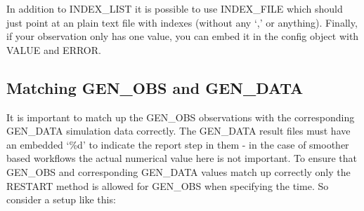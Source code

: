 \documentclass[letterpaper,10pt,english]{sphinxmanual}
\begin{document}
In addition to INDEX\_LIST it is possible to use INDEX\_FILE which
should just point at an plain text file with indexes (without any ‘,’
or anything). Finally, if your observation only has one value, you can
embed it in the config object with VALUE and ERROR.


\subsection{Matching GEN\_OBS and GEN\_DATA}
\label{\detokenize{observations/index:matching-gen-obs-and-gen-data}}
It is important to match up the GEN\_OBS observations with the
corresponding GEN\_DATA simulation data correctly. The GEN\_DATA result
files must have an embedded ‘\%d’ to indicate the report step in them -
in the case of smoother based workflows the actual numerical value
here is not important. To ensure that GEN\_OBS and corresponding
GEN\_DATA values match up correctly only the RESTART method is allowed
for GEN\_OBS when specifying the time. So consider a setup like this:
\end{document}
